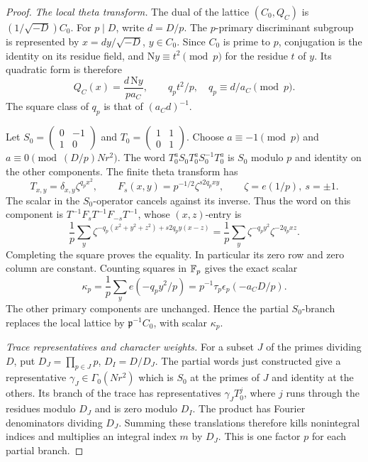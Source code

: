 \begin{proof}
\emph{The local theta transform.}
The dual of the lattice \((C_0,Q_C)\) is
\((1/\sqrt{-D})C_0\). For \(p\mid D\), write \(d=D/p\).
The \(p\)-primary discriminant subgroup is represented by
\(x=dy/\sqrt{-D}\), \(y\in C_0\). Since \(C_0\) is prime to \(p\),
conjugation is the identity on its residue field, and
\(\mathrm Ny\equiv t^2\pmod p\) for the residue \(t\) of \(y\).
Its quadratic form is therefore
\[
 Q_C(x)=\frac{d\,\mathrm Ny}{pa_C},\qquad
 q_p t^2/p,\quad q_p\equiv d/a_C\pmod p.
\]
The square class of \(q_p\) is that of \((a_Cd)^{-1}\).

Let \(S_0=\left(\begin{smallmatrix}0&-1\\1&0\end{smallmatrix}\right)\)
and \(T_0=\left(\begin{smallmatrix}1&1\\0&1\end{smallmatrix}\right)\).
Choose \(a\equiv-1\pmod p\) and
\(a\equiv0\pmod{(D/p)Nr^2}\). The word
\(T_0^aS_0T_0^aS_0^{-1}T_0^a\) is \(S_0\) modulo \(p\) and identity
on the other components. The finite theta transform has
\[
 T_{x,y}=\delta_{x,y}\zeta^{q_px^2},\qquad
 F_s(x,y)=p^{-1/2}\zeta^{s2q_pxy},\qquad
 \zeta=e(1/p),\ s=\pm1.
\]
The scalar in the \(S_0\)-operator cancels against its inverse.
Thus the word on this component is
\(T^{-1}F_sT^{-1}F_{-s}T^{-1}\), whose \((x,z)\)-entry is
\[
 \frac1p\sum_y
 \zeta^{-q_p(x^2+y^2+z^2)+s2q_py(x-z)}
 =\frac1p\sum_y\zeta^{-q_py^2}\zeta^{-2q_pxz}.
\]
Completing the square proves the equality. In particular its zero
row and zero column are constant. Counting squares in \(\mathbb F_p\)
gives the exact scalar
\begin{equation}\label{tame:kappa}
 \kappa_p=\frac1p\sum_y e(-q_py^2/p)
          =p^{-1}\tau_p\epsilon_p(-a_CD/p).
\end{equation}
The other primary components are unchanged. Hence the partial
\(S_0\)-branch replaces the local lattice by
\(\mathfrak p^{-1}C_0\), with scalar \(\kappa_p\).

\emph{Trace representatives and character weights.}
For a subset \(J\) of the primes dividing \(D\), put
\(D_J=\prod_{p\in J}p\), \(D_I=D/D_J\).
The partial words just constructed give a representative
\(\gamma_J\in\Gamma_0(Nr^2)\) which is \(S_0\) at the primes of
\(J\) and identity at the others. Its branch of the trace has
representatives \(\gamma_JT_0^j\), where \(j\) runs through the
residues modulo \(D_J\) and is zero modulo \(D_I\). The product
has Fourier denominators dividing \(D_J\). Summing these translations
therefore kills nonintegral indices and multiplies an integral
index \(m\) by \(D_J\). This is one factor \(p\) for each partial
branch.


\end{proof}
